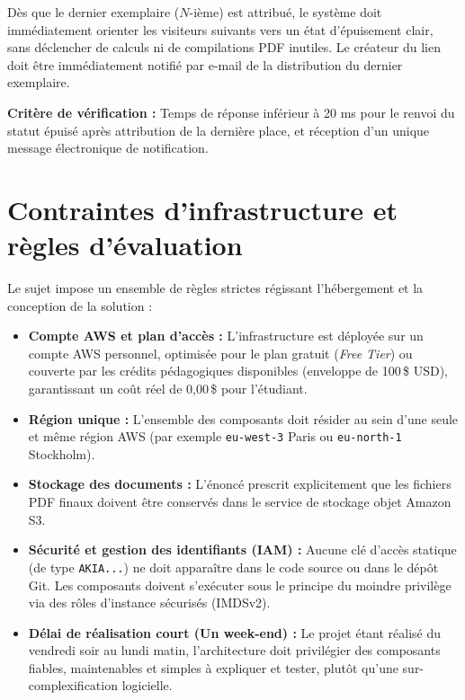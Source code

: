 \begin{criticalbox}
Dès que le dernier exemplaire ($N$-ième) est attribué, le système doit immédiatement orienter les visiteurs suivants vers un état d'épuisement clair, sans déclencher de calculs ni de compilations PDF inutiles. Le créateur du lien doit être immédiatement notifié par e-mail de la distribution du dernier exemplaire.

\smallskip
\textbf{Critère de vérification :} Temps de réponse inférieur à 20 ms pour le renvoi du statut épuisé après attribution de la dernière place, et réception d'un unique message électronique de notification.
\end{criticalbox}

\section{Contraintes d'infrastructure et règles d'évaluation}

Le sujet impose un ensemble de règles strictes régissant l'hébergement et la conception de la solution :

\begin{itemize}
    \item \textbf{Compte AWS et plan d'accès :} L'infrastructure est déployée sur un compte AWS personnel, optimisée pour le plan gratuit (\emph{Free Tier}) ou couverte par les crédits pédagogiques disponibles (enveloppe de 100\,\$ USD), garantissant un coût réel de 0,00\,\$ pour l'étudiant.
    \item \textbf{Région unique :} L'ensemble des composants doit résider au sein d'une seule et même région AWS (par exemple \texttt{eu-west-3} Paris ou \texttt{eu-north-1} Stockholm).
    \item \textbf{Stockage des documents :} L'énoncé prescrit explicitement que les fichiers PDF finaux doivent être conservés dans le service de stockage objet Amazon S3.
    \item \textbf{Sécurité et gestion des identifiants (IAM) :} Aucune clé d'accès statique (de type \texttt{AKIA...}) ne doit apparaître dans le code source ou dans le dépôt Git. Les composants doivent s'exécuter sous le principe du moindre privilège via des rôles d'instance sécurisés (IMDSv2).
    \item \textbf{Délai de réalisation court (Un week-end) :} Le projet étant réalisé du vendredi soir au lundi matin, l'architecture doit privilégier des composants fiables, maintenables et simples à expliquer et tester, plutôt qu'une sur-complexification logicielle.
\end{itemize}

